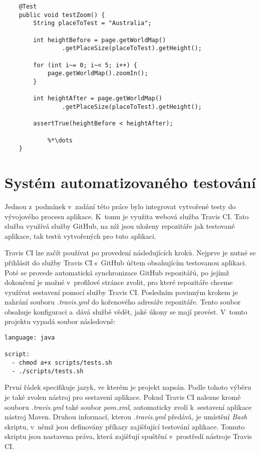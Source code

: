 \documentclass[
    color,   %
	table,   %
    twoside, %
    nolot, nolof,
]{fithesis3}
\begin{document}
\begin{lstlisting}
	@Test
	public void testZoom() {
		String placeToTest = "Australia";
		
		int heightBefore = page.getWorldMap()
				.getPlaceSize(placeToTest).getHeight();
				
		for (int i~= 0; i~< 5; i++) {
			page.getWorldMap().zoomIn();
		}
		
		int heightAfter = page.getWorldMap()
				.getPlaceSize(placeToTest).getHeight();
				
		assertTrue(heightBefore < heightAfter);
		
		 	%*\dots
	}
\end{lstlisting} 

\chapter{Systém automatizovaného testování}
\label{ch:chapter6}
Jednou z~podmínek v~zadání této práce bylo integrovat vytvořené testy do vývojového procesu aplikace. K~tomu je využita webová služba Travis CI. Tato služba využívá služby GitHub, na níž jsou uloženy repozitáře jak testované aplikace, tak testů vytvořených pro tuto aplikaci.

Travis CI lze začít používat po provedení následujících kroků. Nejprve je nutné se přihlásit do služby Travis CI s~GitHub účtem obsahujícím testovanou aplikaci. Poté se provede automatická synchronizace GitHub repozitářů, po jejímž dokončení je možné v~profilové stránce zvolit, pro které repozitáře chceme využívat sestavení pomocí služby Travis CI. Posledním povinným krokem je nahrání souboru \emph{.travis.yml} do kořenového adresáře repozitáře. Tento soubor obsahuje konfiguraci a~dává službě vědět, jaké úkony se mají provést. V~tomto projektu vypadá soubor následovně:

\begin{lstlisting}
language: java

script:
  - chmod a+x scripts/tests.sh
  - ./scripts/tests.sh
\end{lstlisting} 

První řádek specifikuje jazyk, ve kterém je projekt napsán. Podle tohoto výběru je také zvolen nástroj pro sestavení aplikace. Pokud Travis CI nalezne kromě souboru \emph{.travis.yml} také soubor \emph{pom.xml}, automaticky zvolí k~sestavení aplikace nástroj Maven. Druhou informací, kterou \emph{.travis.yml} předává, je umístění \emph{Bash} skriptu, v~němž jsou definovány příkazy zajišťující testování aplikace. Tomuto skriptu jsou nastavena práva, která zajišťují spuštění v~prostředí nástroje Travis CI.
\end{document}
